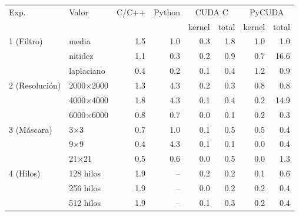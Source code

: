 \begin{tabular}{llrrrrrr}
\toprule
Exp. & Valor & C/C++ & Python & \multicolumn{2}{c}{CUDA C} & \multicolumn{2}{c}{PyCUDA} \\
 & & & & kernel & total & kernel & total \\
\midrule
1 (Filtro) & media & 1.5 & 1.0 & 0.3 & 1.8 & 1.0 & 1.0 \\
 & nitidez & 1.1 & 0.3 & 0.2 & 0.9 & 0.7 & 16.6 \\
 & laplaciano & 0.4 & 0.2 & 0.1 & 0.4 & 1.2 & 0.9 \\
\midrule
2 (Resolución) & 2000$\times$2000 & 1.3 & 4.3 & 0.2 & 0.3 & 0.8 & 0.8 \\
 & 4000$\times$4000 & 1.8 & 4.3 & 0.1 & 0.4 & 0.2 & 14.9 \\
 & 6000$\times$6000 & 0.8 & 0.7 & 0.0 & 0.1 & 0.2 & 0.3 \\
\midrule
3 (Máscara) & 3$\times$3 & 0.7 & 1.0 & 0.1 & 0.5 & 0.5 & 0.4 \\
 & 9$\times$9 & 0.4 & 4.3 & 0.1 & 0.1 & 0.0 & 0.4 \\
 & 21$\times$21 & 0.5 & 0.6 & 0.0 & 0.5 & 0.0 & 1.3 \\
\midrule
4 (Hilos) & 128 hilos & 1.9 & -- & 0.2 & 0.2 & 0.1 & 0.6 \\
 & 256 hilos & 1.9 & -- & 0.0 & 0.2 & 0.2 & 0.4 \\
 & 512 hilos & 1.9 & -- & 0.1 & 0.3 & 0.2 & 0.4 \\
\bottomrule
\end{tabular}
